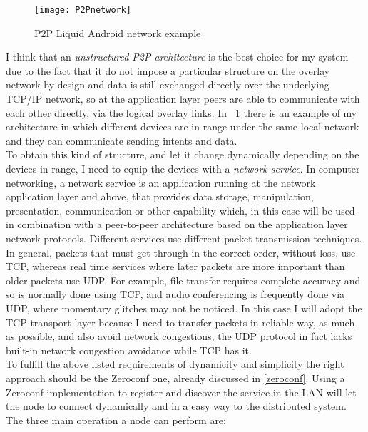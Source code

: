\begin{figure}[h]
\centering
\texttt{[image: P2Pnetwork]}
\caption{P2P Liquid Android network example}
\label{fig:4.3}
\end{figure}
I think that an \textit{unstructured P2P architecture} is the best choice for my system due to the fact that it do not impose a particular structure on the overlay network by design and data is still exchanged directly over the underlying TCP/IP network, so at the application layer peers are able to communicate with each other directly, via the logical overlay links. In \figurename~\ref{fig:4.3} there is an example of my architecture in which different devices are in range under the same local network and they can communicate sending intents and data.\\
To obtain this kind of structure, and let it change dynamically depending on the devices in range, I need to equip the devices with a \textit{network service}. In computer networking, a network service is an application running at the network application layer and above, that provides data storage, manipulation, presentation, communication or other capability which, in this case will be used in combination with a peer-to-peer architecture based on the application layer network protocols. Different services use different packet transmission techniques. In general, packets that must get through in the correct order, without loss, use TCP, whereas real time services where later packets are more important than older packets use UDP. For example, file transfer requires complete accuracy and so is normally done using TCP, and audio conferencing is frequently done via UDP, where momentary glitches may not be noticed. In this case I will adopt the TCP transport layer because I need to transfer packets in reliable way, as much as possible, and also avoid network congestions, the UDP protocol in fact lacks built-in network congestion avoidance while TCP has it.\\
To fulfill the above listed requirements of dynamicity and simplicity the right approach should be the Zeroconf one, already discussed in \ref{zeroconf}. Using a Zeroconf implementation to register and discover the service in the LAN will let the node to connect dynamically and in a easy way to the distributed system. The three main operation a node can perform are:

